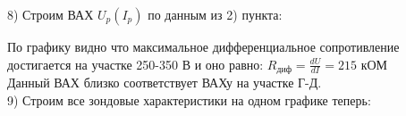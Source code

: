 \documentclass[a4paper,12pt]{extarticle}
\begin{document}
8) Строим ВАХ $U_{p}(I_p)$ по данным из 2) пункта:\\
\begin{minipage}{1\textwidth}
    \end{minipage}
По графику видно что максимальное дифференциальное сопротивление достигается на участке 250-350 В и оно равно: $R_{\text{диф}} = \frac{dU}{dI} = 215$ кОМ \\
Данный ВАХ близко соответствует ВАХу на участке Г-Д. \\
9) Строим все зондовые характеристики на одном графике теперь: \\
\end{document}
